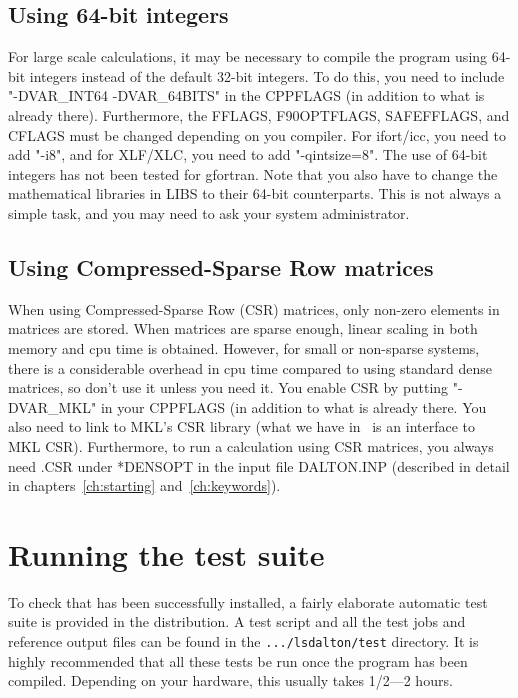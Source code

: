 \subsection{Using 64-bit integers}
For large scale calculations, it may be necessary to compile the program using 64-bit integers instead of the default 32-bit integers.
To do this, you need to include "-DVAR\_INT64 -DVAR\_64BITS" in the CPPFLAGS (in addition to what is already there). Furthermore, 
the FFLAGS, F90OPTFLAGS, SAFEFFLAGS, and CFLAGS must be changed depending on you compiler. For ifort/icc, you need to add "-i8",
and for XLF/XLC, you need to add "-qintsize=8". The use of 64-bit integers has not been tested for gfortran. Note that you also have
to change the mathematical libraries in LIBS to their 64-bit counterparts. This is not always a simple task, and you may need to ask your
system administrator. 

\subsection{Using Compressed-Sparse Row matrices}
When using Compressed-Sparse Row (CSR) matrices, only non-zero elements in matrices are stored. 
When matrices are sparse enough, linear scaling in both memory and cpu time is obtained. However, for
small or non-sparse systems, there is a considerable overhead in cpu time compared to 
using standard dense matrices, so don't use it unless you need it. You enable CSR by putting
"-DVAR\_MKL" in your CPPFLAGS (in addition to what is already there. You also need to link
to MKL's CSR library (what we have in \lsdalton\ is an interface to MKL CSR). Furthermore, to run a calculation
using CSR matrices, you always need .CSR under *DENSOPT in the input file DALTON.INP (described in detail in
chapters~\ref{ch:starting} and~\ref{ch:keywords}).

\section{Running the {\lsdalton} test suite}\label{sec:testsuite}

To check that {\lsdalton} has been successfully installed, a fairly
elaborate automatic test suite is provided in the distribution. A test
script and all the test jobs and reference output files can be found in
the \verb|.../lsdalton/test| directory. It is highly recommended that all
these tests be run once the program has been compiled. Depending on
your hardware, this usually takes 1/2---2 hours.

